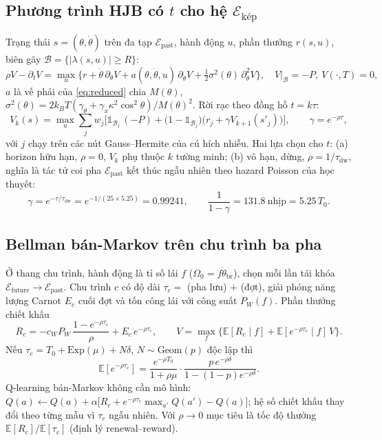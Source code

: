 \documentclass[11pt,a4paper]{article}
\newcommand{\Edual}{\mathcal{E}_{\text{kép}}}
\newcommand{\Epast}{\mathcal{E}_{\text{past}}}
\newcommand{\Efut}{\mathcal{E}_{\text{future}}}
\newcommand{\E}{\mathbb{E}}
\theoremstyle{remark}
\begin{document}
\subsection{Phương trình HJB có $t$ cho hệ $\Edual$}
Trạng thái $s=(\theta,\dot\theta)$ trên đa tạp $\Epast$, hành động $u$, phần thưởng $r(s,u)$, biên gãy $\mathcal B=\{|\lambda(s,u)|\ge R\}$:
\begin{equation}
\rho V-\partial_tV=\max_u\Big\{r+\dot\theta\,\partial_\theta V+a(\theta,\dot\theta,u)\,\partial_{\dot\theta}V+\tfrac12\sigma^2(\theta)\,\partial^2_{\dot\theta}V\Big\},\quad V\big|_{\mathcal B}=-P,\ V(\cdot,T)=0,
\label{eq:HJB}
\end{equation}
$a$ là vế phải của \eqref{eq:reduced} chia $M(\theta)$, $\sigma^2(\theta)=2k_BT(\gamma_\theta+\gamma_x\kappa^2\cos^2\theta)/M(\theta)^2$. Rời rạc theo đồng hồ $t=k\tau$:
\begin{equation}
V_k(s)=\max_u\sum_j w_j\Big[\mathbb 1_{\mathcal B_j}\,(-P)+\big(1-\mathbb 1_{\mathcal B_j}\big)\big(r_j+\gamma V_{k+1}(s'_j)\big)\Big],\qquad \gamma=e^{-\rho\tau},
\label{eq:bellman_k}
\end{equation}
với $j$ chạy trên các nút Gauss--Hermite của cú hích nhiễu. Hai lựa chọn cho $t$: (a) horizon hữu hạn, $\rho=0$, $V_k$ phụ thuộc $k$ tường minh; (b) vô hạn, dừng, $\rho=1/\tau_{\text{dw}}$, nghĩa là tác tử coi pha $\Epast$ kết thúc ngẫu nhiên theo hazard Poisson của học thuyết:
\begin{equation}
\gamma=e^{-\tau/\tau_{\text{dw}}}=e^{-1/(25\times5.25)}=0.99241,\qquad \frac{1}{1-\gamma}=131.8\ \text{nhịp}=5.25\,T_0 .
\label{eq:gamma}
\end{equation}

\subsection{Bellman bán-Markov trên chu trình ba pha}
Ở thang chu trình, hành động là tỉ số lái $f$ ($\Omega_0=f\dot\theta_{\text{br}}$), chọn mỗi lần tái khóa $\Efut\to\Epast$. Chu trình $c$ có độ dài $\tau_c=$ (pha lưu) $+$ (đợt), giải phóng năng lượng Carnot $E_c$ cuối đợt và tốn công lái với công suất $P_W(f)$. Phần thưởng chiết khấu
\begin{equation}
R_c=-c_WP_W\,\frac{1-e^{-\rho\tau_c}}{\rho}+E_c\,e^{-\rho\tau_c},
\qquad V=\max_f\Big\{\E[R_c\mid f]+\E[e^{-\rho\tau_c}\mid f]\,V\Big\}.
\label{eq:smdp}
\end{equation}
Nếu $\tau_c=T_0+\mathrm{Exp}(\mu)+N\delta$, $N\sim\mathrm{Geom}(p)$ độc lập thì
\begin{equation}
\E[e^{-\rho\tau_c}]=\frac{e^{-\rho T_0}}{1+\rho\mu}\cdot\frac{p\,e^{-\rho\delta}}{1-(1-p)e^{-\rho\delta}} .
\label{eq:closed}
\end{equation}
Q-learning bán-Markov không cần mô hình: $Q(a)\leftarrow Q(a)+\alpha\big[R_c+e^{-\rho\tau_c}\max_{a'}Q(a')-Q(a)\big]$; hệ số chiết khấu thay đổi theo từng mẫu vì $\tau_c$ ngẫu nhiên. Với $\rho\to0$ mục tiêu là tốc độ thưởng $\E[R_c]/\E[\tau_c]$ (định lý renewal--reward).
\end{document}
